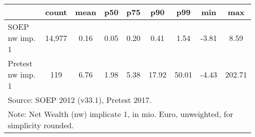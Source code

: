 {
\def\sym#1{\ifmmode^{#1}\else\(^{#1}\)\fi}
\begin{tabular}{l*{1}{cccccccc}}
\hline\hline
                                            &       count&        mean&         p50&         p75&         p90&         p99&         min&         max\\
\hline
SOEP nw imp. 1                              &      14,977&        0.16&        0.05&        0.20&        0.41&        1.54&       -3.81&        8.59\\
Pretest nw imp. 1                           &         119&        6.76&        1.98&        5.38&       17.92&       50.01&       -4.43&      202.71\\
\hline\hline
\multicolumn{9}{l}{\footnotesize Source: SOEP 2012 (v33.1), Pretest 2017.}\\
\multicolumn{9}{l}{\footnotesize Note: Net Wealth (nw) implicate 1, in mio. Euro, unweighted, for simplicity rounded.}\\
\end{tabular}
}
